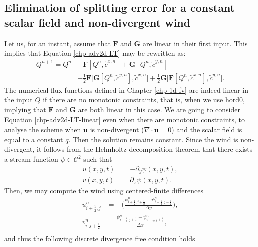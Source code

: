 \subsection{Elimination of splitting error for a constant scalar field and non-divergent wind}
\label{sp-error}
Let us, for an instant, assume that $\mathbf{F}$ and $\mathbf{G}$ are linear in their first input. This implies that Equation \eqref{chp-adv2d-LT} may be rewritten as:
\begin{align}
\label{chp-adv2d-LT-linear}
    Q^{n+1} = Q^n 
    &+ \mathbf{F}[Q^n,\tilde{c}^{x,n}] + \mathbf{G}[Q^n,\tilde{c}^{y,n}] \nonumber \\
    &+\frac{1}{2}\mathbf{F}\bigg[\mathbf{G}[Q^n, \tilde{c}^{y,n}], \tilde{c}^{x,n}\bigg]+
      \frac{1}{2}\mathbf{G}\bigg[\mathbf{F}[Q^n, \tilde{c}^{x,n}], \tilde{c}^{y,n}\bigg].
\end{align}
The numerical flux functions defined in Chapter \ref{chp-1d-fv} are indeed linear in the input $Q$ if there are no monotonic constraints,
that is, when we use hord0,
implying that $\mathbf{F}$ and $\mathbf{G}$ are both linear in this case.
We are going to consider Equation \eqref{chp-adv2d-LT-linear}
even when there are monotonic constraints, to analyse the scheme when $\boldsymbol{u}$ is non-divergent ($\nabla \cdot 
\boldsymbol{u} = 0$) and the
scalar field is equal to a constant $\overline{q}$.
Then the solution remains constant. 
Since the wind is non-divergent, it follows from the Helmholtz decomposition theorem 
that there exists a stream function $\psi \in \mathcal{C}^2$ such that
\begin{align*}
    u(x,y,t) &= -\partial_y \psi(x,y,t),\\
    v(x,y,t) &= \partial_x \psi(x,y,t).
\end{align*}
Then, we may compute the wind using centered-finite differences 
\begin{align*}
    u_{i+\frac{1}{2},j}^{n}&=
    -\bigg(\frac{\psi_{i+\frac{1}{2},j+\frac{1}{2}}^{n}-\psi_{i+\frac{1}{2},j-\frac{1}{2}}^{n}}{\Delta y}\bigg),\\
    v_{i,j+\frac{1}{2}}^{n} &= 
    \frac{\psi_{i+\frac{1}{2},j+\frac{1}{2}}^{n}-\psi_{i-\frac{1}{2},j+\frac{1}{2}}^{n}}{\Delta x},\\
\end{align*}
and thus the following discrete divergence free condition holds
